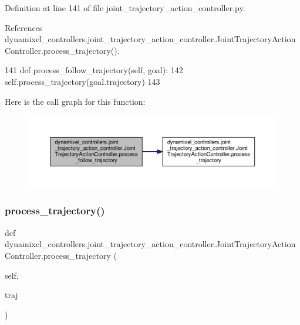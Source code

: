 Definition at line 141 of file joint\+\_\+trajectory\+\_\+action\+\_\+controller.\+py.



References dynamixel\+\_\+controllers.\+joint\+\_\+trajectory\+\_\+action\+\_\+controller.\+Joint\+Trajectory\+Action\+Controller.\+process\+\_\+trajectory().


\begin{DoxyCode}
141     \textcolor{keyword}{def }process\_follow\_trajectory(self, goal):
142         self.process\_trajectory(goal.trajectory)
143 
\end{DoxyCode}
Here is the call graph for this function\+:
\nopagebreak
\begin{figure}[H]
\begin{center}
\leavevmode
\includegraphics[width=350pt]{d1/d22/classdynamixel__controllers_1_1joint__trajectory__action__controller_1_1_joint_trajectory_action_controller_afbfa29ff56121dd37e2dc579e8a32da2_cgraph}
\end{center}
\end{figure}
\mbox{\label{classdynamixel__controllers_1_1joint__trajectory__action__controller_1_1_joint_trajectory_action_controller_a377f9da3c6ee849f3a12ffc08c03f2df}} 
\subsubsection{\texorpdfstring{process\+\_\+trajectory()}{process\_trajectory()}}
{\footnotesize\ttfamily def dynamixel\+\_\+controllers.\+joint\+\_\+trajectory\+\_\+action\+\_\+controller.\+Joint\+Trajectory\+Action\+Controller.\+process\+\_\+trajectory (\begin{DoxyParamCaption}\item[{}]{self,  }\item[{}]{traj }\end{DoxyParamCaption})}



